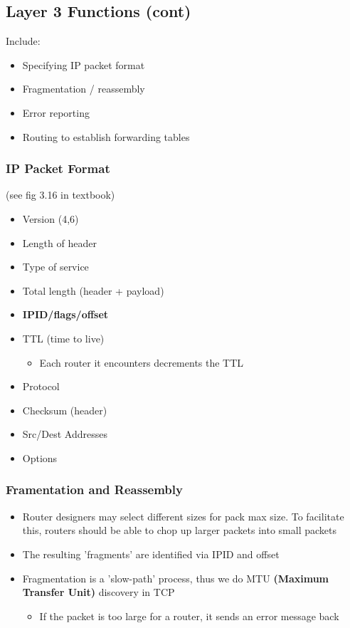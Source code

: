 \documentclass[11pt]{article}
\begin{document}
\subsection{Layer 3 Functions (cont)}
\label{sec:orgheadline66}
Include:
\begin{itemize}
\item Specifying IP packet format
\item Fragmentation / reassembly
\item Error reporting
\item Routing to establish forwarding tables
\end{itemize}

\subsubsection{IP Packet Format}
\label{sec:orgheadline64}
(see fig 3.16 in textbook)
\begin{itemize}
\item Version (4,6)
\item Length of header
\item Type of service
\item Total length (header + payload)
\item \textbf{IPID/flags/offset}
\item TTL (time to live)
\begin{itemize}
\item Each router it encounters decrements the TTL
\end{itemize}
\item Protocol
\item Checksum (header)
\item Src/Dest Addresses
\item Options
\end{itemize}

\subsubsection{Framentation and Reassembly}
\label{sec:orgheadline65}
\begin{itemize}
\item Router designers may select different sizes for pack max size. To
facilitate this, routers should be able to chop up larger packets
into small packets
\item The resulting 'fragments' are identified via IPID and offset
\item Fragmentation is a 'slow-path' process, thus we do MTU \textbf{(Maximum
Transfer Unit)} discovery in TCP
\begin{itemize}
\item If the packet is too large for a router, it sends an error message back
\end{itemize}
\end{itemize}
\end{document}
